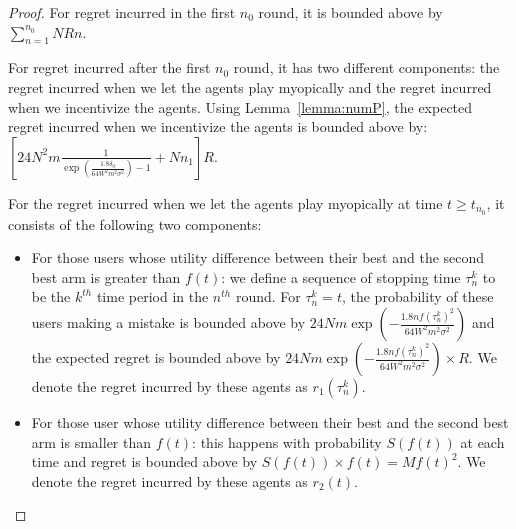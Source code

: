 \documentclass{article}
\begin{document}
\begin{proof}
For regret incurred in the first $n_0$ round, it is bounded above by $\sum_{n=1}^{n_{0}}NRn$.

For regret incurred after the first $n_0$ round, it has two different components: the regret incurred when we let the agents play myopically and the regret incurred when we incentivize the agents. Using Lemma~\ref{lemma:numP}, the expected regret incurred when we incentivize the agents is bounded above by: $\left[24N^2 m \frac{1}{\exp(\frac{1.8\delta_{0}}{64W^2 m^2\sigma^2})-1} + Nn_1\right]R$.

For the regret incurred when we let the agents play myopically at time $t\geq t_{n_0}$, it consists of the following two components:
\begin{itemize}
\item For those users whose utility difference between their best and the second best arm is greater than $f(t)$: we define a sequence of stopping time $\tau_{n}^{k}$ to be the $k^{th}$ time period in the $n^{th}$ round. For $\tau_{n}^{k}=t$, the probability of these users making a mistake is bounded above by $24Nm\exp\left(-\frac{1.8n f(\tau_{n}^{k})^2}{64 W^2 m^2\sigma^2}\right)$ and the expected regret is bounded above by $24Nm\exp\left(-\frac{1.8n f(\tau_{n}^{k})^2}{64 W^2 m^2\sigma^2}\right)\times R$. We denote the regret incurred by these agents as $r_1(\tau_{n}^{k})$.
\item For those user whose utility difference between their best and the second best arm is smaller than $f(t)$: this happens with probability $S(f(t))$ at each time and regret is bounded above by $S(f(t)) \times f(t)=Mf(t)^2$. We denote the regret incurred by these agents as $r_2(t)$.
\end{itemize}


\end{proof}
\end{document}

